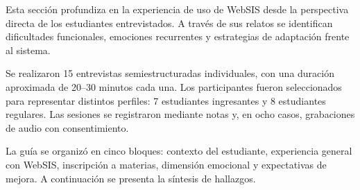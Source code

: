 Esta sección profundiza en la experiencia de uso de WebSIS desde la perspectiva directa de los estudiantes entrevistados. A través de sus relatos se identifican dificultades funcionales, emociones recurrentes y estrategias de adaptación frente al sistema. 

Se realizaron 15 entrevistas semiestructuradas individuales, con una duración aproximada de 20--30 minutos cada una. Los participantes fueron seleccionados para representar distintos perfiles: 7 estudiantes ingresantes y 8 estudiantes regulares. Las sesiones se registraron mediante notas y, en ocho casos, grabaciones de audio con consentimiento.

La guía se organizó en cinco bloques: contexto del estudiante, experiencia general con WebSIS, inscripción a materias, dimensión emocional y expectativas de mejora. A continuación se presenta la síntesis de hallazgos.

